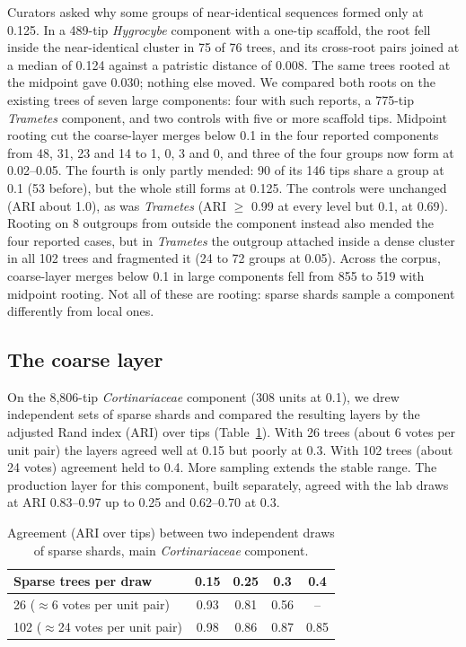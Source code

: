\documentclass[11pt,a4paper]{article}
\begin{document}
Curators asked why some groups of near-identical sequences formed only at 0.125. In a 489-tip
\emph{Hygrocybe} component with a one-tip scaffold, the root fell inside the near-identical cluster
in 75 of 76 trees, and its cross-root pairs joined at a median of 0.124 against a patristic
distance of 0.008. The same trees rooted at the midpoint gave 0.030; nothing else moved. We
compared both roots on the existing trees of seven large components: four with such reports, a
775-tip \emph{Trametes} component, and two controls with five or more scaffold tips. Midpoint
rooting cut the coarse-layer merges below 0.1 in the four reported components from 48, 31, 23
and 14 to 1, 0, 3 and 0, and three of the four groups now form at 0.02--0.05. The fourth is only
partly mended: 90 of its 146 tips share a group at 0.1 (53 before), but the whole still forms at
0.125. The controls were unchanged (ARI about 1.0), as was \emph{Trametes} (ARI $\ge$ 0.99 at
every level but 0.1, at 0.69). Rooting on 8 outgroups from outside the component instead also
mended the four reported cases, but in \emph{Trametes} the outgroup attached inside a dense
cluster in all 102 trees and fragmented it (24 to 72 groups at 0.05). Across the corpus,
coarse-layer merges below 0.1 in large components fell from 855 to 519 with midpoint rooting.
Not all of these are rooting: sparse shards sample a component differently from local ones.

\subsection{The coarse layer}\label{sec:res-coarse}

On the 8,806-tip \emph{Cortinariaceae} component (308 units at 0.1), we drew independent sets of
sparse shards and compared the resulting layers by the adjusted Rand index (ARI) over tips
\citep{hubert1985ari} (Table~\ref{tab:coarse}). With 26 trees (about 6 votes per unit pair) the
layers agreed well at 0.15 but poorly at 0.3. With 102 trees (about 24 votes) agreement held to
0.4. More sampling extends the stable range. The production layer for this component, built
separately, agreed with the lab draws at ARI 0.83--0.97 up to 0.25 and 0.62--0.70 at 0.3.

\begin{table}[t]
\centering\small
\caption{Agreement (ARI over tips) between two independent draws of sparse shards, main
\emph{Cortinariaceae} component.}
\label{tab:coarse}
\begin{tabular}{@{}lcccc@{}}
\toprule
Sparse trees per draw & 0.15 & 0.25 & 0.3 & 0.4 \\
\midrule
26 ($\approx$6 votes per unit pair) & 0.93 & 0.81 & 0.56 & -- \\
102 ($\approx$24 votes per unit pair) & 0.98 & 0.86 & 0.87 & 0.85 \\
\bottomrule
\end{tabular}
\end{table}
\end{document}
